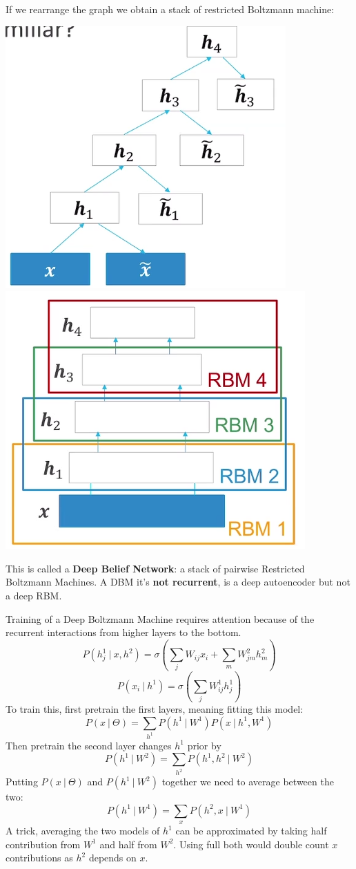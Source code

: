 \documentclass[10pt]{report}
\begin{document}
If we rearrange the graph we obtain a stack of restricted Boltzmann machine:\begin{center}
	\includegraphics[scale=0.5]{81.png}
	\includegraphics[scale=0.5]{82.png}
\end{center}
This is called a \textbf{Deep Belief Network}: a stack of pairwise Restricted Boltzmann Machines. A DBM it's \textbf{not recurrent}, is a deep autoencoder but not a deep RBM.\\
\pagebreak

Training of a Deep Boltzmann Machine requires attention because of the recurrent interactions from higher layers to the bottom.
$$P(h_j^1\:|\:x,h^2)=\sigma\left(\sum_jW_{ij}x_i+\sum_m W^2_{jm}h_m^2\right)$$
$$P(x_i\:|\:h^1)=\sigma\left(\sum_jW_{ij}^1h_j^1\right)$$
To train this, first pretrain the first layers, meaning fitting this model:
$$P(x\:|\:\Theta) =\sum_{h^1}P(h^1\:|\:W^1)P(x\:|\:h^1,W^1)$$
Then pretrain the second layer changes $h^1$ prior by
$$P(h^1\:|\:W^2) = \sum_{h^2}P(h^1,h^2\:|\:W^2)$$
Putting $P(x\:|\:\Theta)$ and $P(h^1\:|\:W^2)$ together we need to average between the two:
$$P(h^1\:|\:W^1) = \sum_x P(h^2,x\:|\:W^1)$$
A trick, averaging the two models of $h^1$ can be approximated by taking half contribution from $W^1$ and half from $W^2$. Using full both would double count $x$ contributions as $h^2$ depends on $x$.
\end{document}
